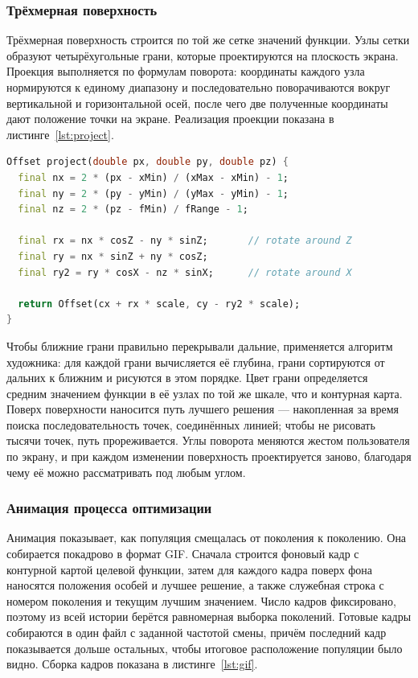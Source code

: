\documentclass[14pt, a4paper]{extarticle}
\begin{document}
\subsubsection{Трёхмерная поверхность}

Трёхмерная поверхность строится по той же сетке значений функции. Узлы сетки
образуют четырёхугольные грани, которые проектируются на плоскость экрана. Проекция
выполняется по формулам поворота: координаты каждого узла нормируются к
единому диапазону и последовательно поворачиваются вокруг вертикальной и
горизонтальной осей, после чего две полученные координаты дают положение точки на
экране. Реализация проекции показана в листинге~\ref{lst:project}.

\begin{lstlisting}[language=Dart, caption={Проекция точки поверхности на экран}, label={lst:project}]
Offset project(double px, double py, double pz) {
  final nx = 2 * (px - xMin) / (xMax - xMin) - 1;
  final ny = 2 * (py - yMin) / (yMax - yMin) - 1;
  final nz = 2 * (pz - fMin) / fRange - 1;

  final rx = nx * cosZ - ny * sinZ;       // rotate around Z
  final ry = nx * sinZ + ny * cosZ;
  final ry2 = ry * cosX - nz * sinX;      // rotate around X

  return Offset(cx + rx * scale, cy - ry2 * scale);
}
\end{lstlisting}

Чтобы ближние грани правильно перекрывали дальние, применяется алгоритм художника:
для каждой грани вычисляется её глубина, грани сортируются от дальних к ближним и
рисуются в этом порядке. Цвет грани определяется средним значением функции в её
узлах по той же шкале, что и контурная карта. Поверх поверхности наносится путь
лучшего решения --- накопленная за время поиска последовательность точек,
соединённых линией; чтобы не рисовать тысячи точек, путь прореживается. Углы
поворота меняются жестом пользователя по экрану, и при каждом изменении поверхность
проектируется заново, благодаря чему её можно рассматривать под любым углом.

\subsubsection{Анимация процесса оптимизации}

Анимация показывает, как популяция смещалась от поколения к поколению. Она
собирается покадрово в формат GIF. Сначала строится фоновый кадр с контурной картой
целевой функции, затем для каждого кадра поверх фона наносятся положения особей и
лучшее решение, а также служебная строка с номером поколения и текущим лучшим
значением. Число кадров фиксировано, поэтому из всей истории берётся равномерная
выборка поколений. Готовые кадры собираются в один файл с заданной частотой смены,
причём последний кадр показывается дольше остальных, чтобы итоговое расположение
популяции было видно. Сборка кадров показана в листинге~\ref{lst:gif}.
\end{document}
